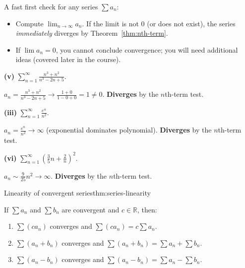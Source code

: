 \begin{examtip}

A fast first check for any series $\sum a_n$:

\begin{itemize}

\item Compute $\lim_{n\to\infty} a_n$. If the limit is not $0$ (or does not exist), the series \emph{immediately} diverges by Theorem~\ref{thm:nth-term}.

\item If $\lim a_n=0$, you cannot conclude convergence; you will need additional ideas (covered later in the course).

\end{itemize}

\end{examtip}

\begin{examplebox}[title={Worked Example (Tutorial 8, Q5 collection): quick divergence checks}]

\textbf{(v)} $\displaystyle\sum_{n=1}^{\infty}\frac{n^3+n^2}{n^3-2n+5}$.

$a_n=\frac{n^3+n^2}{n^3-2n+5}\to \frac{1+0}{1-0+0}=1\ne 0$. \textbf{Diverges} by the $n$th-term test.

\textbf{(iii)} $\displaystyle\sum_{n=1}^{\infty}\frac{e^n}{n^2}$.

$a_n=\frac{e^n}{n^2}\to \infty$ (exponential dominates polynomial). \textbf{Diverges} by the $n$th-term test.

\textbf{(vi)} $\displaystyle\sum_{n=1}^{\infty}\left(\frac{3}{5}n+\frac{2}{n}\right)^2$.

$a_n\sim \frac{9}{25}n^2\to\infty$. \textbf{Diverges} by the $n$th-term test.

\end{examplebox}

\begin{theorem}{Linearity of convergent series}{thm:series-linearity}

If $\sum a_n$ and $\sum b_n$ are convergent and $c\in\mathbb{R}$, then:

\begin{enumerate}[label=(\roman*), leftmargin=3em]

\item $\sum (c a_n)$ converges and $\sum (c a_n)=c\sum a_n$.

\item $\sum (a_n+b_n)$ converges and $\sum (a_n+b_n)=\sum a_n+\sum b_n$.

\item $\sum (a_n-b_n)$ converges and $\sum (a_n-b_n)=\sum a_n-\sum b_n$.

\end{enumerate}

\end{theorem}

